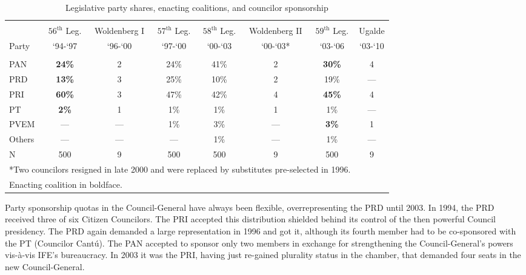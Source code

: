 \documentclass[12 pt, letter]{article}
\begin{document}
\begin{sidewaystable}
\caption{Legislative party shares, enacting coalitions, and
councilor sponsorship}\label{T:proposals}
\begin{center}
\begin{tabular}{lccccccc}
\hline\\ [-1.5ex]
      & $56^{\text{th}}$ Leg. & Woldenberg I & $57^{\text{th}}$ Leg. & $58^{\text{th}}$ Leg. & Woldenberg II & $59^{\text{th}}$ Leg. & Ugalde \\
Party &  `94-`97  &  `96-`00  &  `97-`00  &  `00-`03  &  `00-`03*  &  `03-`06  &  `03-`10 \\
\hline\\ [-1ex]
 PAN  & \textbf{24\%} & 2   & 24\% & 41\% & 2   & \textbf{30\%} & 4   \\
 PRD  & \textbf{13\%} & 3   & 25\% & 10\% & 2   & 19\%          & --- \\
 PRI  & \textbf{60\%} & 3   & 47\% & 42\% & 4   & \textbf{45\%} & 4   \\
 PT   & \textbf{ 2\%} & 1   &  1\% &  1\% & 1   & 1\%           & --- \\
 PVEM & ---           & --- &  1\% &  3\% & --- & \textbf{3\%}  & 1   \\
 Others & ---         & --- &  --- &  1\% & --- & 1\%           & --- \\
 N    & 500           & 9   &  500 &  500 & 9   & 500           & 9   \\
\hline
\multicolumn{7}{l}{\footnotesize{*Two councilors resigned in late 2000 and were replaced by substitutes pre-selected in 1996.}}\\
\multicolumn{7}{l}{\footnotesize{Enacting coalition in boldface.}}\\
\end{tabular}
\end{center}
\end{sidewaystable}

Party sponsorship quotas in the Council-General have always been
flexible, overrepresenting the PRD until 2003.  In 1994, the PRD
received three of six Citizen Councilors.  The PRI accepted this
distribution shielded behind its control of the then powerful
Council presidency.  The PRD again demanded a large representation
in 1996 and got it, although its fourth member had to be
co-sponsored with the PT (Councilor Cant\'u).  The PAN accepted to
sponsor only two members in exchange for strengthening the
Council-General's powers vis-\`{a}-vis IFE's bureaucracy.  In 2003
it was the PRI, having just re-gained plurality status in the
chamber, that demanded four seats in the new Council-General.
\end{document}
